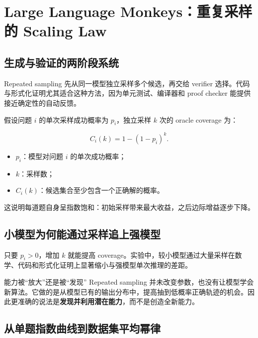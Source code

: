 \section{Large Language Monkeys：重复采样的 Scaling Law}

\subsection{生成与验证的两阶段系统}

Repeated sampling 先从同一模型独立采样多个候选，再交给 verifier 选择。代码与形式化证明尤其适合这种方法，因为单元测试、编译器和 proof checker 能提供接近确定性的自动反馈。


假设问题 $i$ 的单次采样成功概率为 $p_i$，独立采样 $k$ 次的 oracle coverage 为：

$$
C_i(k)=1-(1-p_i)^k.
$$

\begin{itemize}
    \item $p_i$：模型对问题 $i$ 的单次成功概率；
    \item $k$：采样数；
    \item $C_i(k)$：候选集合至少包含一个正确解的概率。
\end{itemize}

这说明每道题自身呈指数饱和：初始采样带来最大收益，之后边际增益逐步下降。

\subsection{小模型为何能通过采样追上强模型}

只要 $p_i>0$，增加 $k$ 就能提高 coverage。实验中，较小模型通过大量采样在数学、代码和形式化证明上显著缩小与强模型单次推理的差距。


\begin{knowledgebox}{能力被“放大”还是被“发现”}
Repeated sampling 并未改变参数，也没有让模型学会新算法。它做的是从模型已有的输出分布中，提高抽到低概率正确轨迹的机会。因此更准确的说法是\textbf{发现并利用潜在能力}，而不是创造全新能力。
\end{knowledgebox}

\subsection{从单题指数曲线到数据集平均幂律}


